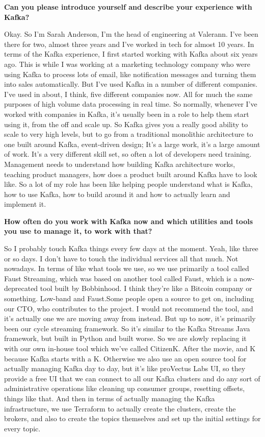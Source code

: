 
\textbf{Can you please introduce yourself and describe your experience with Kafka? }

Okay. So I'm Sarah Anderson, I'm the head of engineering at Valerann. I've been there for two, almost three years and I've worked in tech for almost 10 years. In terms of the Kafka experience, I first started working with Kafka about six years ago. This is while I was working at a marketing technology company who were using Kafka to process lots of email, like notification messages and turning them into sales automatically. But I've used Kafka in a number of different companies. I've used in about, I think, five different companies now. All for much the same purposes of high volume data processing in real time. So normally, whenever I've worked with companies in Kafka, it's usually been in a role to help them start using it, from the off and scale up. So Kafka gives you a really good ability to scale to very high levels, but to go from a traditional monolithic architecture to one built around Kafka, event-driven design; It's a large work, it's a large amount of work. It's a very different skill set, so often a lot of developers need training. Management needs to understand how building Kafka architecture works, teaching product managers, how does a product built around Kafka have to look like. So a lot of my role has been like helping people understand what is Kafka, how to use Kafka, how to build around it and how to actually learn and implement it. 

\textbf{How often do you work with Kafka now and which utilities and tools you use to manage it, to work with that?}

So I probably touch Kafka things every few days at the moment. Yeah, like three or so days. I don't have to touch the individual services all that much. Not nowadays. In terms of like what tools we use, so we use primarily a tool called Faust Streaming, which was based on another tool called Faust, which is a now-deprecated tool built by Bobbinhood. I think they're like a Bitcoin company or something. Low-band and Faust.Some people open a source to get on, including our CTO, who contributes to the project. I would not recommend the tool, and it's actually one we are moving away from instead. But up to now, it's primarily been our cycle streaming framework. So it's similar to the Kafka Streams Java framework, but built in Python and built worse. So we are slowly replacing it with our own in-house tool which we've called CitizenK. After the movie, and K because Kafka starts with a K. Otherwise we also use an open source tool for actually managing Kafka day to day, but it's like proVectus Labs UI, so they provide a free UI that we can connect to all our Kafka clusters and do any sort of administrative operations like cleaning up consumer groups, resetting offsets, things like that. And then in terms of actually managing the Kafka infrastructure, we use Terraform to actually create the clusters, create the brokers, and also to create the topics themselves and set up the initial settings for every topic. 

